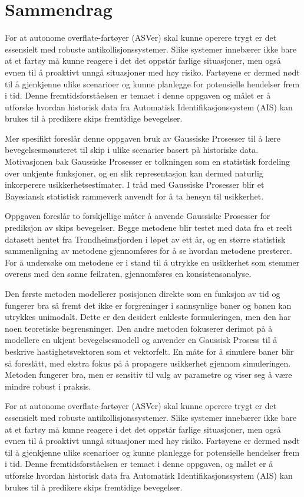 \chapter*{Sammendrag}
For at autonome overflate-fartøyer (ASVer) skal kunne operere trygt er det essensielt med robuste antikollisjonssystemer. Slike systemer innebærer ikke bare at et fartøy må kunne reagere i det det oppstår farlige situasjoner, men også evnen til å proaktivt unngå situasjoner med høy risiko. Fartøyene er dermed nødt til å gjenkjenne ulike scenarioer og kunne planlegge for potensielle hendelser frem i tid. Denne fremtidsforståelsen er temaet i denne oppgaven og målet er å utforske hvordan historisk data fra Automatisk Identifikasjonssystem (AIS) kan brukes til å predikere skips fremtidige bevegelser.

Mer spesifikt foreslår denne oppgaven bruk av Gaussiske Prosesser til å lære bevegelsesmønsteret til skip i ulike scenarier basert på historiske data. Motivasjonen bak Gaussiske Prosesser er tolkningen som en statistisk fordeling over unkjente funksjoner, og en slik representasjon kan dermed naturlig inkorperere usikkerhetsestimater. I tråd med Gaussiske Prosesser blir et Bayesiansk statistisk rammeverk anvendt for å ta hensyn til usikkerhet.

Oppgaven foreslår to forskjellige måter å anvende Gaussiske Prosesser for prediksjon av skips bevegelser. Begge metodene blir testet med data fra et reelt datasett hentet fra Trondheimsfjorden i løpet av ett år, og en større statistisk sammenligning av metodene gjennomføres for å se hvordan metodene presterer. For å undersøke om metodene er i stand til å utrykke en usikkerhet som stemmer overens med den sanne feilraten, gjennomføres en konsistensanalyse.

Den første metoden modellerer posisjonen direkte som en funksjon av tid og fungerer bra så fremt det ikke er forgreninger i sannsynlige baner og banen kan utrykkes unimodalt. Dette er den desidert enkleste formuleringen, men den har noen teoretiske begrensninger.
Den andre metoden fokuserer derimot på å modellere en ukjent bevegelsesmodell og anvender en Gaussisk Prosess til å beskrive hastighetsvektoren som et vektorfelt. En måte for å simulere baner blir så foreslått, med ekstra fokus på å propagere usikkerhet gjennom simuleringen. Metoden fungerer bra, men er sensitiv til valg av parametre og viser seg å være mindre robust i praksis. 




For at autonome overflate-fartøyer (ASVer) skal kunne operere trygt er det essensielt med robuste antikollisjonssystemer. Slike systemer innebærer ikke bare at et fartøy må kunne reagere i det det oppstår farlige situasjoner, men også evnen til å proaktivt unngå situasjoner med høy risiko. Fartøyene er dermed nødt til å gjenkjenne ulike scenarioer og kunne planlegge for potensielle hendelser frem i tid. Denne fremtidsforståelsen er temaet i denne oppgaven, og målet er å utforske hvordan historisk data fra Automatisk Identifikasjonssystem (AIS) kan brukes til å predikere skips fremtidige bevegelser.


